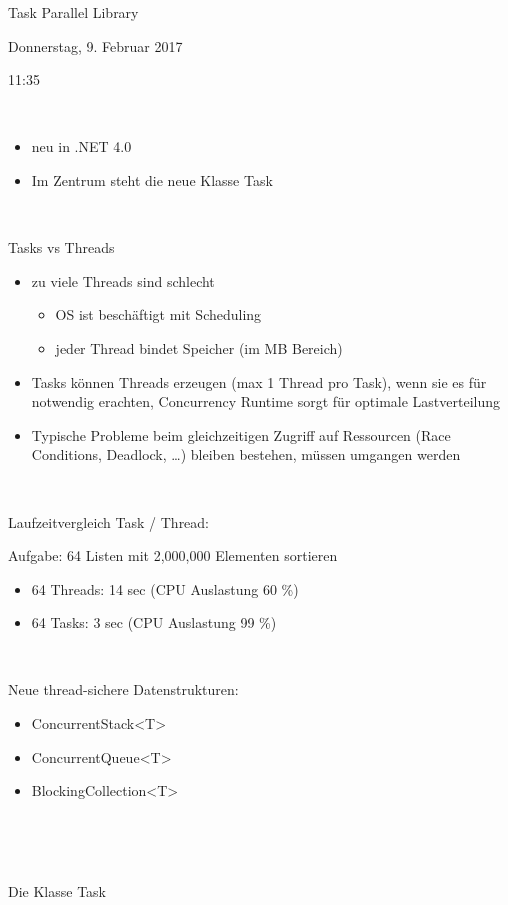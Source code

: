 Task Parallel Library

Donnerstag, 9. Februar 2017

11:35

~

\begin{itemize}
\item neu in .NET 4.0
\item Im Zentrum steht die neue Klasse Task
\end{itemize}
~

Tasks vs Threads

\begin{itemize}
\item zu viele Threads sind schlecht

\begin{itemize}
\item OS ist beschäftigt mit Scheduling
\item jeder Thread bindet Speicher (im MB Bereich)
\end{itemize}
\item Tasks können Threads erzeugen (max 1 Thread pro Task), wenn sie es für notwendig erachten, Concurrency Runtime sorgt für optimale Lastverteilung
\item Typische Probleme beim gleichzeitigen Zugriff auf Ressourcen (Race Conditions, Deadlock, …) bleiben bestehen, müssen umgangen werden
\end{itemize}
~

Laufzeitvergleich Task / Thread:

Aufgabe: 64 Listen mit 2,000,000 Elementen sortieren

\begin{itemize}
\item 64 Threads: 14 sec (CPU Auslastung 60 \%)
\item 64 Tasks: 3 sec (CPU Auslastung 99 \%)
\end{itemize}
~

Neue thread-sichere Datenstrukturen:

\begin{itemize}
\item ConcurrentStack{\textless}T{\textgreater}
\item ConcurrentQueue{\textless}T{\textgreater}
\item BlockingCollection{\textless}T{\textgreater}
\end{itemize}
~

~

Die Klasse Task

